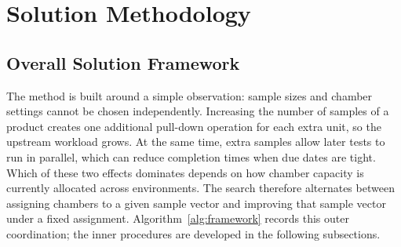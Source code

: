 \documentclass[11pt]{article}
\begin{document}
\section{Solution Methodology}
\label{sec:solution_methodology}

\subsection{Overall Solution Framework}
\label{subsec:framework}
\label{subsec:overall_framework}

The method is built around a simple observation: sample sizes and
chamber settings cannot be chosen independently.
Increasing the number of samples of a product creates one additional
pull-down operation for each extra unit, so the upstream workload
grows.
At the same time, extra samples allow later tests to run in parallel,
which can reduce completion times when due dates are tight.
Which of these two effects dominates depends on how chamber capacity
is currently allocated across environments.
The search therefore alternates between assigning chambers to a given
sample vector and improving that sample vector under a fixed
assignment.
Algorithm~\ref{alg:framework} records this outer coordination;
the inner procedures are developed in the following subsections.
\end{document}
